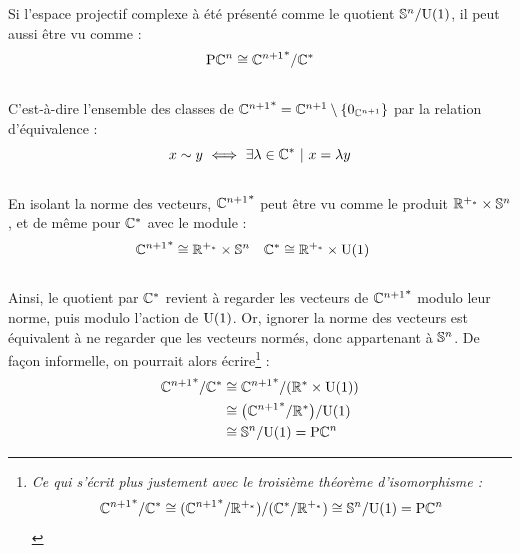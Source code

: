 Si l'espace projectif complexe à été présenté comme le quotient $\S{n}/\U{1}$, il peut aussi être vu comme :
\[\PC{n} \cong {\C^{n+1}}^*/\C^*\]
\\
C'est-à-dire l'ensemble des classes de ${\C^{n+1}}^* = \C^{n+1} \setminus \{0_{\C^{n+1}}\}$ par la relation d'équivalence :
\[x \sim y\ \Llr\ \exists \lambda\in\C^*\ |\ x=\lambda y\]
\\
En isolant la norme des vecteurs, ${\C^{n+1}}^*$ peut être vu comme le produit $\R^{+_*} \times \S{n}$, et de même pour $\C^*$ avec le module :
\begin{align*}
	{\C^{n+1}}^* &\cong \R^{+_*} \times \S{n}  &  \C^* &\cong \R^{+_*} \times \U{1}
\end{align*}
\\
Ainsi, le quotient par $\C^*$ revient à regarder les vecteurs de ${\C^{n+1}}^*$ modulo leur norme, puis modulo l'action de $\U{1}$. Or, ignorer la norme des vecteurs est équivalent à ne regarder que les vecteurs normés, donc appartenant à $\S{n}$. De façon informelle, on pourrait alors écrire\footnote{\itshape
	Ce qui s'écrit plus justement avec le troisième théorème d'isomorphisme : \[{\C^{n+1}}^*/\C^* \cong ({\C^{n+1}}^* / \R^{+_*})/(\C^* / \R^{+_*}) \cong \S{n}/\U{1} = \PC{n}\]
} :
\begin{align*}
	{\C^{n+1}}^*/\C^* &\cong {\C^{n+1}}^*/(\R^* \times \U{1})\\
	&\cong \big( {\C^{n+1}}^*/\R^* \big) /\U{1} \\
	&\cong \S{n}  / \U{1} = \PC{n} 
\end{align*}
\skipl

